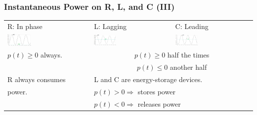 \documentclass{beamer}
\begin{document}

\begin{frame}[fragile]
\frametitle{Instantaneous Power on R, L, and C (III)}

\vspace{-1cm}

\begin{tabular}{|l|l|l|}
\hline
R: In phase & L: Lagging & C: Leading \\
\includegraphics[width=0.3\textwidth]{src/FigPower_inphase.png}
&
\includegraphics[width=0.3\textwidth]{src/FigPower_lagging.png}
&
\includegraphics[width=0.3\textwidth]{src/FigPower_leading.png}
\\ \hline
$p(t) \geq 0$ always.
&
\multicolumn{2}{c|}{$p(t) \geq 0$ half the times }
\\
&
\multicolumn{2}{c|}{$p(t) \leq 0$ another half }
\\ \hline
R always consumes
&
\multicolumn{2}{l|}{L and C are energy-storage devices.}
\\
power.
&
\multicolumn{2}{l|}{$p(t) > 0 \Rightarrow$ stores power}
\\
&
\multicolumn{2}{l|}{$p(t) < 0 \Rightarrow$ releases power}
\\ \hline
\end{tabular}

\end{frame}

\end{document}
